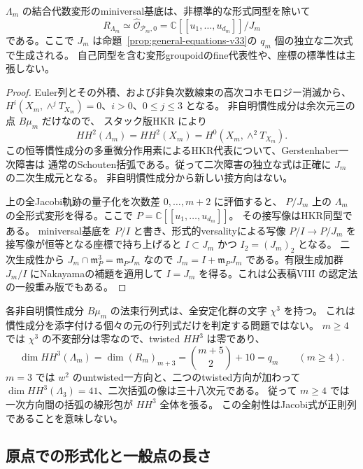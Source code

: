 \begin{theorem}[一般重みの二次的miniversal基底]
\label{thm:general-hull-v33}
$\Lambda_m$ の結合代数変形のminiversal基底は、非標準的な形式同型を除いて
\[
 R_{\Lambda_m}\simeq\widehat{\mathcal O}_{\mathscr P_m,0}
 =\mathbb C[[u_1,\ldots,u_{d_m}]]/J_m
\]
である。ここで $J_m$ は命題~\ref{prop:general-equations-v33}の $q_m$ 個の独立な二次式で生成される。
自己同型を含む変形groupoidのfine代表性や、座標の標準性は主張しない。
\end{theorem}

\begin{proof}
Euler列とその外積、および非負次数線束の高次コホモロジー消滅から、
$H^i(X_m,\wedge^jT_{X_m})=0$、$i>0$、$0\le j\le3$ となる。
非自明慣性成分は余次元三の点 $B\mu_m$ だけなので、
スタック版HKR \cite[Corollary~4.16]{FPSS} により
\[
 HH^2(\Lambda_m)=HH^2(X_m)=H^0(X_m,\wedge^2T_{X_m}).
\]
この恒等慣性成分の多重微分作用素によるHKR代表について、Gerstenhaber一次障害は
通常のSchouten括弧である。従って二次障害の独立な式は正確に $J_m$ の二次生成元となる。
非自明慣性成分から新しい接方向はない。

上の全Jacobi軌跡の量子化を次数差 $0,\ldots,m+2$ に評価すると、
$P/J_m$ 上の $\Lambda_m$ の全形式変形を得る。ここで $P=\mathbb C[[u_1,\ldots,u_{d_m}]]$。
その接写像はHKR同型である。
miniversal基底を $P/I$ と書き、形式的versalityによる写像
$P/I\to P/J_m$ を接写像が恒等となる座標で持ち上げると
$I\subset J_m$ かつ $I_2=(J_m)_2$ となる。
二次生成性から $J_m\cap\mathfrak m_P^3=\mathfrak m_PJ_m$ なので
$J_m=I+\mathfrak m_PJ_m$ である。有限生成加群 $J_m/I$ にNakayamaの補題を適用して
$I=J_m$ を得る。これは公表稿VIII \cite{VKAmbient32} の認定法の一般重み版でもある。
\end{proof}

\begin{remark}[三次Hochschild群と二次式の個数]
各非自明慣性成分 $B\mu_m$ の法束行列式は、全安定化群の文字 $\chi^3$ を持つ。
これは慣性成分を添字付ける個々の元の行列式だけを判定する問題ではない。
$m\ge4$ では $\chi^3$ の不変部分は零なので、twisted $HH^3$ は零であり、
\[
 \dim HH^3(\Lambda_m)=\dim(R_m)_{m+3}
 =\binom{m+5}{2}+10=q_m\qquad(m\ge4).
\]
$m=3$ では $w^2$ のuntwisted一方向と、二つのtwisted方向が加わって
$\dim HH^3(\Lambda_3)=41$、二次括弧の像は三十八次元である。
従って $m\ge4$ では一次方向間の括弧の線形包が $HH^3$ 全体を張る。
この全射性はJacobi式が正則列であることを意味しない。
\end{remark}

\subsection{原点での形式化と一般点の長さ}

